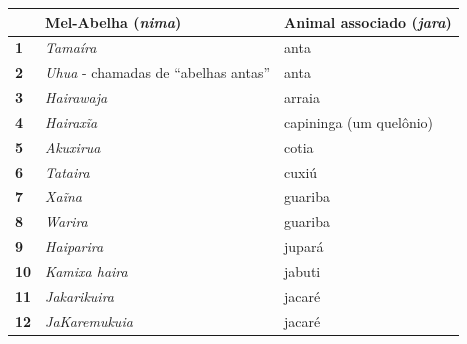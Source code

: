 \begin{table}[H]
\centering
\label{my-label}
\begin{tabular}{|l|l|l|}
\hline
            & \textbf{Mel-Abelha (\emph{nima})}         & \textbf{Animal associado (\emph{jara})}                                               \\ \hline
\textbf{1}  & \textit{Tamaíra}                            & anta                                                                                    \\ \hline
\textbf{2}  & \textit{Uhua} - chamadas de ``abelhas antas'' & anta                                                                                    \\ \hline
\textbf{3}  & \textit{Hairawaja}                          & arraia                                                                                  \\ \hline
\textbf{4}  & \textit{Hairaxĩa}                           & capininga (um quelônio)                                                                 \\ \hline
\textbf{5}  & \textit{Akuxirua}                           & cotia                                                                                   \\ \hline
\textbf{6}  & \textit{Tataira}                            & cuxiú                                                                                   \\ \hline
\textbf{7}  & \textit{Xaĩna}                             & guariba                                                                                 \\ \hline
\textbf{8}  & \textit{Warira}                             & guariba                                                                                 \\ \hline
\textbf{9}  & \textit{Haiparira}                          & jupará                                                                                  \\ \hline
\textbf{10} & \textit{Kamixa haira}                       & jabuti                                                                                  \\ \hline
\textbf{11} & \textit{Jakarikuira}                        & jacaré                                                                                  \\ \hline
\textbf{12} & \textit{JaKaremukuia}                       & jacaré                                                                                  \\ \hline

\end{tabular}
\end{table}
